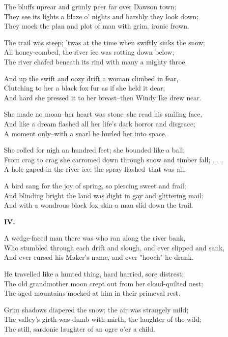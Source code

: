 \begin{poemblock}
The bluffs uprear and grimly peer far over Dawson town;\\
They see its lights a blaze o' nights and harshly they look down;\\
They mock the plan and plot of man with grim, ironic frown.

The trail was steep; 'twas at the time when swiftly sinks the snow;\\
All honey-combed, the river ice was rotting down below;\\
The river chafed beneath its rind with many a mighty throe.

And up the swift and oozy drift a woman climbed in fear,\\
Clutching to her a black fox fur as if she held it dear;\\
And hard she pressed it to her breast--then Windy Ike drew near.

She made no moan--her heart was stone--she read his smiling face,\\
And like a dream flashed all her life's dark horror and disgrace;\\
A moment only--with a snarl he hurled her into space.

She rolled for nigh an hundred feet; she bounded like a ball;\\
From crag to crag she carromed down through snow and timber fall; . . .\\
A hole gaped in the river ice; the spray flashed--that was all.

A bird sang for the joy of spring, so piercing sweet and frail;\\
And blinding bright the land was dight in gay and glittering mail;\\
And with a wondrous black fox skin a man slid down the trail.

\textbf{IV.}

A wedge-faced man there was who ran along the river bank,\\
Who stumbled through each drift and slough, and ever slipped and sank,\\
And ever cursed his Maker's name, and ever "hooch" he drank.

He travelled like a hunted thing, hard harried, sore distrest;\\
The old grandmother moon crept out from her cloud-quilted nest;\\
The aged mountains mocked at him in their primeval rest.

Grim shadows diapered the snow; the air was strangely mild;\\
The valley's girth was dumb with mirth, the laughter of the wild;\\
The still, sardonic laughter of an ogre o'er a child.


\end{poemblock}
